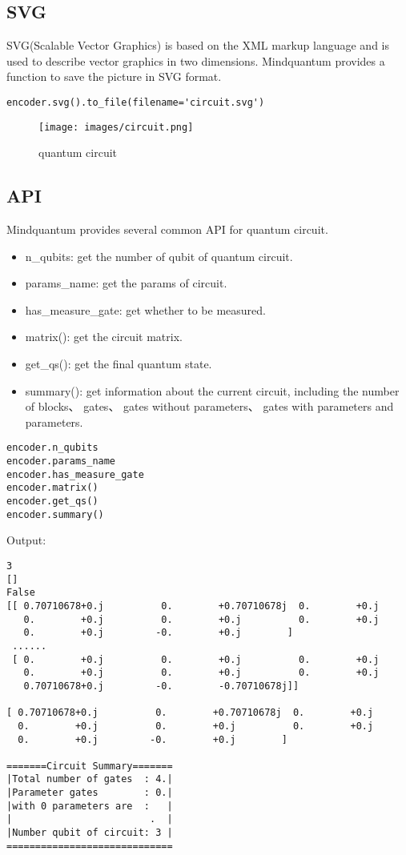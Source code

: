 \subsection{SVG}
SVG(Scalable Vector Graphics) is based on the XML markup language and is used to describe vector graphics in two dimensions. Mindquantum provides a function to save the picture in SVG format.
\begin{lstlisting}
encoder.svg().to_file(filename='circuit.svg')
\end{lstlisting}
\begin{figure}[h]
    \begin{center}
        \texttt{[image: images/circuit.png]}
    \end{center}
    \caption{quantum circuit}
\end{figure}
\subsection{API}
Mindquantum provides several common API for quantum circuit.
\begin{itemize}
    \item n\_qubits: get the number of qubit of quantum circuit.
    \item params\_name: get the params of circuit.
    \item has\_measure\_gate: get whether to be measured.
    \item matrix(): get the circuit matrix.
    \item get\_qs(): get the final quantum state.
    \item summary(): get information about the current circuit, including the number of blocks、 gates、 gates without parameters、 gates with parameters and parameters.
\end{itemize}
\begin{lstlisting}
encoder.n_qubits
encoder.params_name
encoder.has_measure_gate
encoder.matrix() 
encoder.get_qs()
encoder.summary()
\end{lstlisting}
Output:
\begin{lstlisting}
3
[]
False
[[ 0.70710678+0.j          0.        +0.70710678j  0.        +0.j
   0.        +0.j          0.        +0.j          0.        +0.j
   0.        +0.j         -0.        +0.j        ]
 ......
 [ 0.        +0.j          0.        +0.j          0.        +0.j
   0.        +0.j          0.        +0.j          0.        +0.j
   0.70710678+0.j         -0.        -0.70710678j]]
   
[ 0.70710678+0.j          0.        +0.70710678j  0.        +0.j
  0.        +0.j          0.        +0.j          0.        +0.j
  0.        +0.j         -0.        +0.j        ]
  
=======Circuit Summary=======
|Total number of gates  : 4.|
|Parameter gates        : 0.|
|with 0 parameters are  :   |
|                        .  |
|Number qubit of circuit: 3 |
=============================  
\end{lstlisting}
